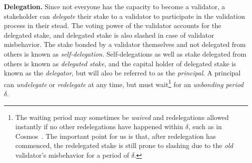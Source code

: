 \noindent
\textbf{Delegation.} Since not everyone has the capacity to become a validator,
a stakeholder can \emph{delegate} their stake to a validator to participate in
the validation process in their stead. The voting power of the validator accounts
for the delegated stake, and delegated stake is also slashed in case of validator
misbehavior. The stake bonded by a validator themselves and not delegated from
others is known as \emph{self-delegation}. Self-delegations as
well as stake delegated from others is known as \emph{delegated stake},
and the capital holder of delegated stake is known as the \emph{delegator},
but will also be referred to as the \emph{principal}.
A principal can \emph{undelegate} or \emph{redelegate} at any time,
but must wait\footnote{The waiting period may sometimes be \emph{waived} and redelegations
allowed instantly if no other redelegations have happened within $\delta$, such as
in Cosmos~\cite{cosmos-staking-module}. The important point for us is that, after redelegation has commenced, the
redelegated stake is still prone to slashing due to the \emph{old} validator's misbehavior
for a period of $\delta$.} for an \emph{unbonding period} $\delta$.

